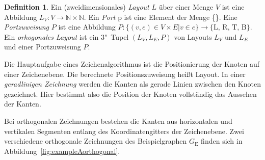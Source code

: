 \documentclass[a4paper]{scrreprt}
\theoremstyle{definition}
\newtheorem{definition}[satz]{Definition}
\newcommand{\N}{\mathbb{N}}
\begin{document}
\begin{definition}
  Ein (zweidimensionales) \emph{Layout} $L$ über einer Menge $V$ ist eine Abbildung $L_V : V \to \N \times \N $. Ein \emph{Port} p ist eine Element der Menge \{\}. Eine \emph{Portzuweisung} $P$ ist eine Abbildung $P: \{(v, e) \in V \times E | v \in e\} \to \{\text{L, R, T, B}\}$. Ein \emph{orhogonales Layout} ist ein 3"~Tupel $(L_V,L_E,P)$ von Layouts $L_V$ und $L_E$ und einer Portzuweisung $P$.
\end{definition}

Die Hauptaufgabe eines Zeichenalgorithmus ist die Positionierung der Knoten auf einer Zeichenebene. Die berechnete Positionszuweisung heißt Layout. In einer \emph{geradlinigen Zeichnung} werden die Kanten als gerade Linien zwischen den Knoten gezeichnet. Hier bestimmt also die Position der Knoten vollständig das Aussehen der Kanten.

Bei orthogonalen Zeichnungen bestehen die Kanten aus horizontalen und vertikalen Segmenten entlang des Koordinatengitters der Zeichenebene. Zwei verschiedene orthogonale Zeichnungen des Beispielgraphen $G_\text{E}$ finden sich in Abbildung~\ref{fig:exampleAorthogonal}.
\end{document}
